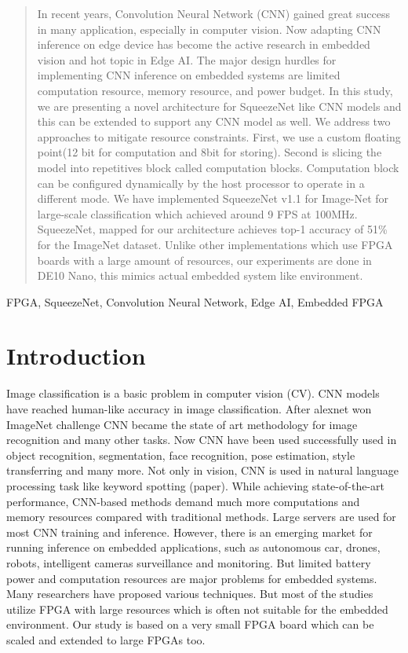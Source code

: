 \documentclass[conference]{IEEEtran}
\begin{document}
\begin{abstract}
In recent years, Convolution Neural Network (CNN) gained great success in many application, especially in computer vision. Now adapting CNN inference on edge device has become the active research in embedded vision and hot topic in Edge AI. The major design hurdles for implementing CNN inference on embedded systems are limited computation resource, memory resource, and power budget. In this study, we are presenting a novel architecture for SqueezeNet\cite{squeezenet} like CNN models and this can be extended to support any CNN model as well. We address two approaches to mitigate resource constraints. First, we use a custom floating point(12 bit for computation and 8bit for storing). Second is slicing the model into repetitives block called computation blocks. Computation block can be configured dynamically by the host processor to operate in a different mode. We have implemented SqueezeNet v1.1 for Image-Net\cite{imagenet} for large-scale classification which achieved around 9 FPS at 100MHz. SqueezeNet, mapped for our architecture achieves top-1 accuracy of 51\% for the ImageNet dataset. Unlike other implementations which use FPGA boards with a large amount of resources, our experiments are done in DE10 Nano, this mimics actual embedded system like environment.

\end{abstract}

\begin{IEEEkeywords}
FPGA, SqueezeNet, Convolution Neural Network,  Edge AI,  Embedded FPGA
\end{IEEEkeywords}

\section{Introduction}
Image classification is a basic problem in computer vision (CV). CNN models have reached human-like accuracy in image classification. After alexnet\cite{alexnet} won ImageNet challenge CNN became the state of art methodology for image recognition and many other tasks. Now CNN have been used successfully used in object recognition, segmentation, face recognition, pose estimation, style transferring and many more. Not only in vision, CNN is used in natural language processing task like keyword spotting (paper). While achieving state-of-the-art performance, CNN-based methods demand much more computations and memory resources compared with traditional methods. Large servers are used for most CNN training and inference. However, there is an emerging market for running inference on embedded applications, such as autonomous car, drones, robots, intelligent cameras surveillance and monitoring. But limited battery power and computation resources are major problems for embedded systems. Many researchers have proposed various techniques. But most of the studies utilize FPGA with large resources \cite{zynqnet} which is often not suitable for the embedded environment. Our study is based on a very small FPGA board which can be scaled and extended to large FPGAs too.
\end{document}
